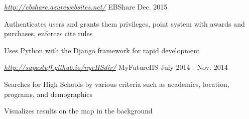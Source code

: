 \begin{cventries}
\iffalse
  \cventry
  {\textit{\url{https://github.com/SupaStuff/lasermaze} } }
    {LaserMaze}
    {Feb. 2016}
    {}
    {
      \begin{cvitems}
        \item {Ebook sharing system designed in Software Engineering course}
        \item {Authenticates users and grants them privileges, point system with awards and purchases, enforces cite rules}
        \item {Python was the primary language used with the Django framework}
      \end{cvitems}
    }
\fi

\iftrue
  \cventry
  {\textit{\url{http://ebshare.azurewebsites.net/} } }
    {EBShare}
    {Dec. 2015}
    {}
    {
      \begin{cvitems}
        \item {Authenticates users and grants them privileges, point system with awards and purchases, enforces cite rules}
        \item {Uses Python with the Django framework for rapid development}
      \end{cvitems}
    }
\fi

\iffalse
  \cventry
  {\textit{\url{http://www.mariamiamaya.com/} } }
    {Maya's Cooking with Love}
    {July 2015 - Sep. 2015}
    {}
    {
      \begin{cvitems}
        \item {Website for Maria Maya, an Christian author who wishes to share
		  her love for cooking}
        \item {Styled using responsive CSS to accommodate various screen sizes}
        \item {The site features an introduction page, a few sample recipe
		  pages, and a contact page}
      \end{cvitems}
    }
\fi

\iftrue
  \cventry
  {\textit{\url{http://supastuff.github.io/nycHSdir/} } }
    {MyFutureHS}
    {July 2014 - Nov. 2014}
    {}
    {
      \begin{cvitems}
        \item {Searches for High Schools by various criteria such as academics, location, programs, and demographics}
        \item {Visualizes results on the map in the background}
      \end{cvitems}
    }
\fi


\end{cventries}
